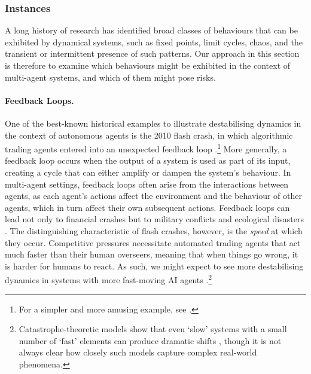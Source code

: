 \subsubsection{Instances}

A long history of research has identified broad classes of behaviours that can be exhibited by dynamical systems, such as fixed points, limit cycles, chaos, and the transient or intermittent presence of such patterns.
Our approach in this section is therefore to examine which behaviours might be exhibited in the context of multi-agent systems, and which of them might pose risks.

\paragraph{Feedback Loops.}
One of the best-known historical examples to illustrate destabilising dynamics in the context of autonomous agents is the 2010 flash crash, in which algorithmic trading agents entered into an unexpected {feedback loop} \citep[see also ]{CTFC2010}.\footnote{For a simpler and more amusing example, see .}
More generally, a feedback loop occurs when the output of a system is used as part of its input, creating a cycle that can either amplify or dampen the system's behaviour. In multi-agent settings, feedback loops often arise from the interactions between agents, as each agent's actions affect the environment and the behaviour of other agents, which in turn affect their own subsequent actions.
Feedback loops can lead not only to financial crashes but to military conflicts \citep[see also ]{Richardson1960} and ecological disasters \citep{Holling1973}.
The distinguishing characteristic of flash crashes, however, is the \emph{speed} at which they occur. Competitive pressures necessitate automated trading agents that act much faster than their human overseers, meaning that when things go wrong, it is harder for humans to react.
As such, we might expect to see more destabilising dynamics in systems with more fast-moving AI agents \citep{Maas2018}.\footnote{Catastrophe-theoretic models show that even `slow' systems with a small number of `fast' elements can produce dramatic shifts \citep{Zeeman1976}, though it is not always clear how closely such models capture complex real-world phenomena.}


